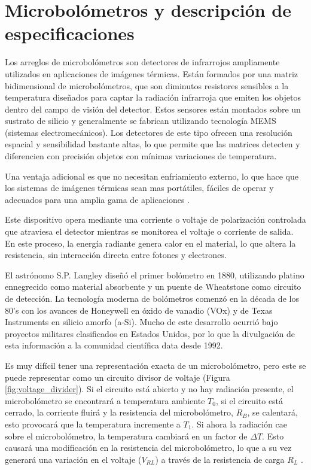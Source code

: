 \chapter{Microbolómetros y descripción de especificaciones}
Los arreglos de microbolómetros son detectores de infrarrojos ampliamente utilizados en aplicaciones de imágenes térmicas. Están formados por una matriz bidimensional de microbolómetros, que son diminutos resistores sensibles a la temperatura diseñados para captar la radiación infrarroja que emiten los objetos dentro del campo de visión del detector. Estos sensores están montados sobre un sustrato de silicio y generalmente se fabrican utilizando tecnología MEMS (sistemas electromecánicos). Los detectores de este tipo ofrecen una resolución espacial y sensibilidad bastante altas, lo que permite que las matrices detecten y diferencien con precisión objetos con mínimas variaciones de temperatura.


Una ventaja adicional es que no necesitan enfriamiento externo, lo que hace que los sistemas de imágenes térmicas sean mas portátiles, fáciles de operar y adecuados para una amplia gama de aplicaciones \cite{Fusetto2023}.


Este dispositivo opera mediante una corriente o voltaje de polarización controlada que atraviesa el detector mientras se monitorea el voltaje o corriente de salida. En este proceso, la energía radiante genera calor en el material, lo que altera la resistencia, sin interacción directa entre fotones y electrones.


El astrónomo S.P. Langley diseñó el primer bolómetro en 1880, utilizando platino ennegrecido como material absorbente y un puente de Wheatstone como circuito de detección. La tecnología moderna de bolómetros comenzó en la década de los 80's con los avances de Honeywell en óxido de vanadio (VOx) y de Texas Instruments en silicio amorfo (a-Si). Mucho de este desarrollo ocurrió bajo proyectos militares clasificados en Estados Unidos, por lo que la divulgación de esta información a la comunidad científica data desde 1992.


Es muy difícil tener una representación exacta de un microbolómetro, pero este se puede representar como un circuito divisor de voltaje (Figura \ref{fig:voltage_divider}). Si el circuito está abierto y no hay radiación presente, el microbolómetro se encontrará a temperatura ambiente $T_{0}$, si el circuito está cerrado, la corriente fluirá y la resistencia del microbolómetro, $R_{B}$, se calentará, esto provocará que la temperatura incremente a $T_{1}$. Si ahora la radiación cae sobre el microbolómetro, la temperatura cambiará en un factor de $\Delta T$. Esto causará una modificación en la resistencia del microbolómetro, lo que a su vez generará una variación en el voltaje ($V_{RL}$) a través de la resistencia de carga $R_{L}$ \cite{Rogalski}. 

